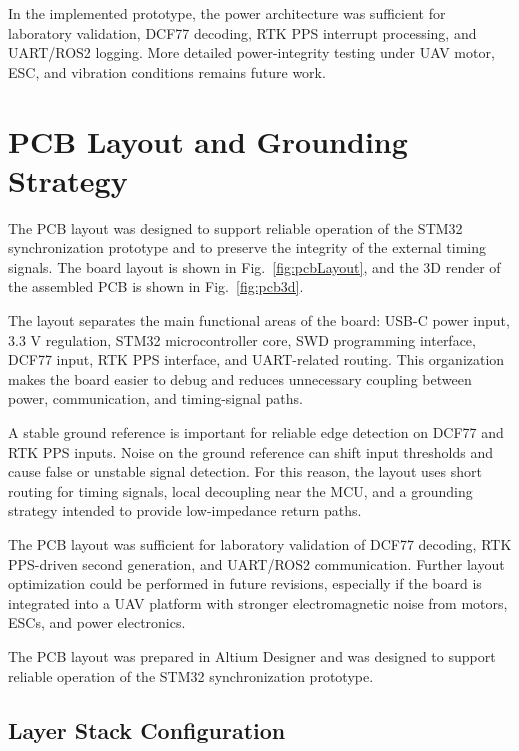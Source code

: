 In the implemented prototype, the power architecture was sufficient for laboratory validation, DCF77 decoding, RTK PPS interrupt processing, and UART/ROS2 logging. More detailed power-integrity testing under UAV motor, ESC, and vibration conditions remains future work.

\section{PCB Layout and Grounding Strategy}

The PCB layout was designed to support reliable operation of the STM32 synchronization prototype and to preserve the integrity of the external timing signals. The board layout is shown in Fig.~\ref{fig:pcbLayout}, and the 3D render of the assembled PCB is shown in Fig.~\ref{fig:pcb3d}.

The layout separates the main functional areas of the board: USB-C power input, 3.3 V regulation, STM32 microcontroller core, SWD programming interface, DCF77 input, RTK PPS interface, and UART-related routing. This organization makes the board easier to debug and reduces unnecessary coupling between power, communication, and timing-signal paths.

A stable ground reference is important for reliable edge detection on DCF77 and RTK PPS inputs. Noise on the ground reference can shift input thresholds and cause false or unstable signal detection. For this reason, the layout uses short routing for timing signals, local decoupling near the MCU, and a grounding strategy intended to provide low-impedance return paths.

The PCB layout was sufficient for laboratory validation of DCF77 decoding, RTK PPS-driven second generation, and UART/ROS2 communication. Further layout optimization could be performed in future revisions, especially if the board is integrated into a UAV platform with stronger electromagnetic noise from motors, ESCs, and power electronics.

The PCB layout was prepared in Altium Designer \cite{altiumDesignerDocs} and was designed to support reliable operation of the STM32 synchronization prototype.

\subsection{Layer Stack Configuration}

